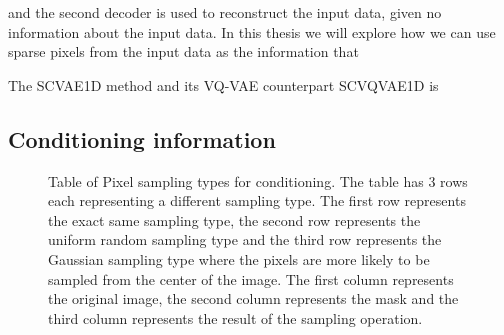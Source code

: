 and the second decoder is used to reconstruct the input data, given no
information about the input data. In this thesis we will explore how we can use
sparse pixels from the input data as the information that

The SCVAE1D method and its VQ-VAE counterpart SCVQVAE1D is

\subsection{Conditioning information}

\begin{figure}
    \centering
    
    \caption[Table of Pixel sampling types for conditioning.]%
    {
        Table of Pixel sampling types for conditioning. The table has 3 rows each representing a different sampling type. The first row represents the exact same sampling type, the second row represents the uniform random sampling type and the third row represents the Gaussian sampling type where the pixels are more likely to be sampled from the center of the image. The first column represents the original image, the second column represents the mask and the third column represents the result of the sampling operation.
    }\label{SamplingFigure}
\end{figure}

